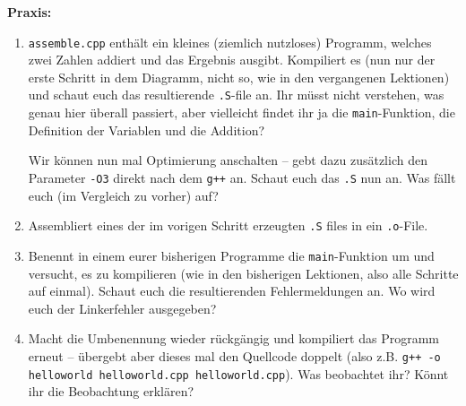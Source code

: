 \textbf{Praxis:}
\begin{enumerate}
    \item \texttt{assemble.cpp} enthält ein kleines (ziemlich nutzloses)
        Programm, welches zwei Zahlen addiert und das Ergebnis ausgibt.
        Kompiliert es (nun nur der erste Schritt in dem Diagramm, nicht so, wie
        in den vergangenen Lektionen) und schaut euch das resultierende
        \texttt{.S}-file an. Ihr müsst nicht verstehen, was genau hier überall
        passiert, aber vielleicht findet ihr ja die \texttt{main}-Funktion, die
        Definition der Variablen und die Addition?

        Wir können nun mal Optimierung anschalten -- gebt dazu zusätzlich den
        Parameter \texttt{-O3} direkt nach dem \texttt{g++} an. Schaut euch das
        \texttt{.S} nun an. Was fällt euch (im Vergleich zu vorher) auf?
    \item Assembliert eines der im vorigen Schritt erzeugten \texttt{.S} files
        in ein \texttt{.o}-File.
    \item Benennt in einem eurer bisherigen Programme die
        \texttt{main}-Funktion um und versucht, es zu kompilieren (wie in den
        bisherigen Lektionen, also alle Schritte auf einmal). Schaut euch die
        resultierenden Fehlermeldungen an. Wo wird euch der Linkerfehler
        ausgegeben?
    \item Macht die Umbenennung wieder rückgängig und kompiliert das Programm
        erneut -- übergebt aber dieses mal den Quellcode doppelt (also z.B.
        \texttt{g++ -o helloworld helloworld.cpp helloworld.cpp}). Was
        beobachtet ihr? Könnt ihr die Beobachtung erklären?
\end{enumerate}

